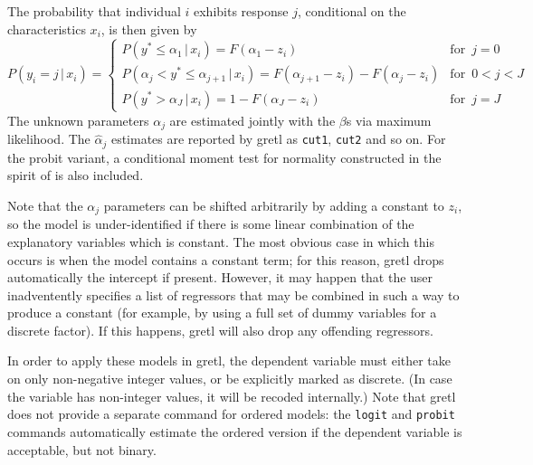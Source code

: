 The probability that individual $i$ exhibits response $j$, conditional
on the characteristics $x_i$, is then given by
%
\begin{equation}
  \label{eq:QR-ordered}
  P(y_i = j \,|\, x_i) = \left\{
    \begin{array}{ll}
      P(y^* \leq \alpha_1 \,|\, x_i) = F(\alpha_1 - z_i) & \textrm{for }\, j = 0 \\
      P(\alpha_j < y^* \leq \alpha_{j+1} \,|\, x_i) = 
      F(\alpha_{j+1} - z_i) -  F(\alpha_j - z_i) & \textrm{for }\, 0 < j < J \\
      P(y^* > \alpha_J \,|\, x_i) = 1 -  F(\alpha_J - z_i) & \textrm{for }\, j = J 
    \end{array}
    \right.
\end{equation}
%
The unknown parameters $\alpha_j$ are estimated jointly with the
$\beta$s via maximum likelihood.  The $\hat{\alpha}_j$ estimates are
reported by gretl as \texttt{cut1}, \texttt{cut2} and so on. For
the probit variant, a conditional moment test for normality
constructed in the spirit of \cite{chesher-irish87} is also included.

Note that the $\alpha_j$ parameters can be shifted arbitrarily by
adding a constant to $z_i$, so the model is under-identified if there
is some linear combination of the explanatory variables which is
constant. The most obvious case in which this occurs is when the model
contains a constant term; for this reason, gretl drops
automatically the intercept if present. However, it may happen that
the user inadventently specifies a list of regressors that may be
combined in such a way to produce a constant (for example, by using a
full set of dummy variables for a discrete factor). If this happens,
gretl will also drop any offending regressors.

In order to apply these models in gretl, the dependent variable
must either take on only non-negative integer values, or be explicitly
marked as discrete.  (In case the variable has non-integer values, it
will be recoded internally.)  Note that gretl does not provide a
separate command for ordered models: the \texttt{logit} and
\texttt{probit} commands automatically estimate the ordered version if
the dependent variable is acceptable, but not binary.

